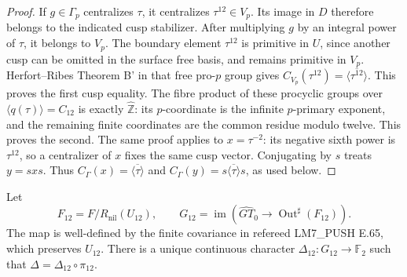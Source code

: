 \begin{proof}
If \(g\in\Gamma_p\) centralizes \(\tau\), it
centralizes \(\tau^{12}\in V_p\). Its image in
\(D\) therefore belongs to the indicated cusp
stabilizer. After multiplying \(g\) by an integral
power of \(\tau\), it belongs to \(V_p\).
The boundary element \(\tau^{12}\) is primitive
in \(U\), since another cusp can be omitted in
the surface free basis, and remains primitive
in \(V_p\). Herfort--Ribes Theorem B' in that
free pro-\(p\) group gives
\(C_{V_p}(\tau^{12})=\overline{\langle\tau^{12}\rangle}\).
This proves the first cusp equality. The fibre
product of these procyclic groups over
\(\langle q(\tau)\rangle=C_{12}\) is exactly
\(\widehat{\mathbb Z}\): its \(p\)-coordinate
is the infinite \(p\)-primary exponent, and the
remaining finite coordinates are the common
residue modulo twelve. This proves the second.
The same proof applies to \(x=\tau^{-2}\): its
negative sixth power is \(\tau^{12}\), so a
centralizer of \(x\) fixes the same cusp vector.
Conjugating by \(s\) treats \(y=sxs\). Thus
\(C_\Gamma(x)=\overline{\langle\tau\rangle}\)
and \(C_\Gamma(y)=s\overline{\langle\tau\rangle}s\),
as used below.
\end{proof}

Let
\[
 F_{12}=F/R_{\mathrm{nil}}(U_{12}),\qquad
 G_{12}=\operatorname{im}\!\left(
 \widehat{GT}_0\longrightarrow
               \operatorname{Out}^{\sharp}(F_{12})\right).
\]
The map is well-defined by the finite covariance in
refereed LM7\_PUSH E.65, which preserves \(U_{12}\).
There is a unique continuous character
\(\Delta_{12}:G_{12}\to\mathbb F_2\) such that
\(\Delta=\Delta_{12}\circ\pi_{12}\).

